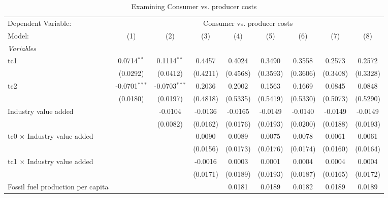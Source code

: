 
\begin{table}[htbp]
   \caption{Examining Consumer vs. producer costs}
   \centering
   \begin{tabular}{lcccccccc}
      \tabularnewline \midrule \midrule
      Dependent Variable: & \multicolumn{8}{c}{Consumer vs. producer costs}\\
      Model:                                  & (1)             & (2)             & (3)      & (4)      & (5)      & (6)      & (7)      & (8)\\  
      \midrule
      \emph{Variables}\\
      tc1                                     & 0.0714$^{**}$   & 0.1114$^{**}$   & 0.4457   & 0.4024   & 0.3490   & 0.3558   & 0.2573   & 0.2572\\   
                                              & (0.0292)        & (0.0412)        & (0.4211) & (0.4568) & (0.3593) & (0.3606) & (0.3408) & (0.3328)\\   
      tc2                                     & -0.0701$^{***}$ & -0.0703$^{***}$ & 0.2036   & 0.2002   & 0.1563   & 0.1669   & 0.0845   & 0.0848\\   
                                              & (0.0180)        & (0.0197)        & (0.4818) & (0.5335) & (0.5419) & (0.5330) & (0.5073) & (0.5290)\\   
      Industry value added                    &                 & -0.0104         & -0.0136  & -0.0165  & -0.0149  & -0.0140  & -0.0149  & -0.0149\\   
                                              &                 & (0.0082)        & (0.0162) & (0.0176) & (0.0193) & (0.0200) & (0.0188) & (0.0193)\\   
      tc0 $\times$ Industry value added       &                 &                 & 0.0090   & 0.0089   & 0.0075   & 0.0078   & 0.0061   & 0.0061\\   
                                              &                 &                 & (0.0156) & (0.0173) & (0.0176) & (0.0174) & (0.0160) & (0.0164)\\   
      tc1 $\times$ Industry value added       &                 &                 & -0.0016  & 0.0003   & 0.0001   & 0.0004   & 0.0004   & 0.0004\\   
                                              &                 &                 & (0.0171) & (0.0189) & (0.0193) & (0.0187) & (0.0165) & (0.0172)\\   
      Fossil fuel production per capita       &                 &                 &          & 0.0181   & 0.0189   & 0.0182   & 0.0189   & 0.0189\\   

\end{tabular}
\end{table}
